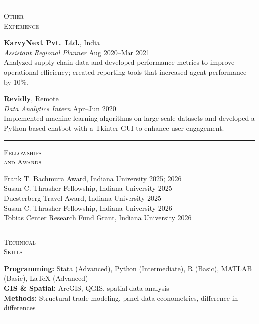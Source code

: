 \documentclass[10pt, a4paper]{article}
\newlength{\lblwidth}
\newlength{\cntwidth}
\newenvironment{cvsec}[1]{%
  \vspace{8pt}%
  \noindent%
  \begin{minipage}[t]{\lblwidth}%
    \raggedright\small\textsc{#1}%
  \end{minipage}%
  \hspace{6pt}%
  \begin{minipage}[t]{\cntwidth}%
    \raggedright%
}{%
  \end{minipage}\par\vspace{6pt}%
}
\begin{document}
\noindent\rule{\textwidth}{0.2pt}

\begin{cvsec}{Other\\Experience}
\textbf{KarvyNext Pvt.\ Ltd.}, India \\
\textit{Assistant Regional Planner} \hfill Aug 2020--Mar 2021 \\
Analyzed supply-chain data and developed performance metrics to improve operational efficiency; created reporting tools that increased agent performance by 10\%.

\bigskip
\textbf{Revidly}, Remote \\
\textit{Data Analytics Intern} \hfill Apr--Jun 2020 \\
Implemented machine-learning algorithms on large-scale datasets and developed a Python-based chatbot with a Tkinter GUI to enhance user engagement.
\end{cvsec}

\noindent\rule{\textwidth}{0.2pt}

\begin{cvsec}{Fellowships\\and Awards}
Frank T. Bachmura Award, Indiana University \hfill 2025; 2026 \\[4pt]
Susan C. Thrasher Fellowship, Indiana University \hfill 2025 \\[4pt]
Duesterberg Travel Award, Indiana University \hfill 2025 \\[4pt]
Susan C. Thrasher Fellowship, Indiana University \hfill 2026 \\[4pt]
Tobias Center Research Fund Grant, Indiana University \hfill 2026 \\[4pt]
\end{cvsec}

\noindent\rule{\textwidth}{0.2pt}

\begin{cvsec}{Technical\\Skills}
\textbf{Programming:} Stata (Advanced), Python (Intermediate), R (Basic), MATLAB (Basic), LaTeX (Advanced) \\[4pt]
\textbf{GIS \& Spatial:} ArcGIS, QGIS, spatial data analysis  \\[4pt]
\textbf{Methods:} Structural trade modeling, panel data econometrics, difference-in-differences
\end{cvsec}

\noindent\rule{\textwidth}{0.2pt}
\end{document}

